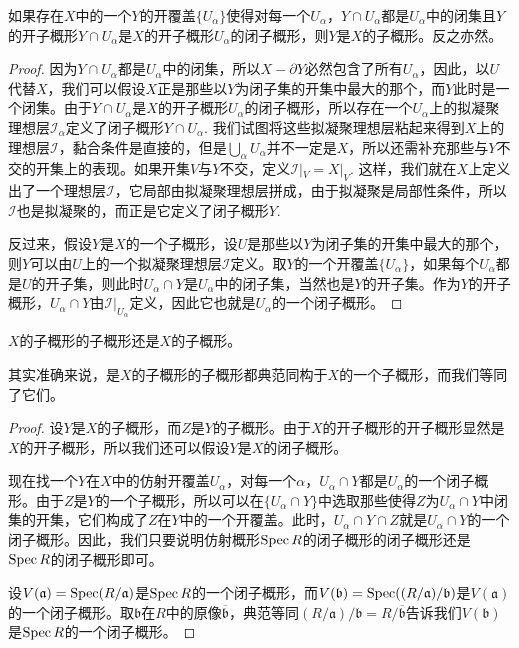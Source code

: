 \begin{pro}[子概形的局部刻画]
如果存在$X$中的一个$Y$的开覆盖$\{U_\alpha\}$使得对每一个$U_\alpha$，$Y\cap U_\alpha$都是$U_\alpha$中的闭集且$Y$的开子概形$Y\cap U_\alpha$是$X$的开子概形$U_\alpha$的闭子概形，则$Y$是$X$的子概形。反之亦然。
\end{pro}

\begin{proof}
	因为$Y\cap U_\alpha$都是$U_\alpha$中的闭集，所以$X-\partial Y$必然包含了所有$U_\alpha$，因此，以$U$代替$X$，我们可以假设$X$正是那些以$Y$为闭子集的开集中最大的那个，而$Y$此时是一个闭集。由于$Y\cap U_\alpha$是$X$的开子概形$U_\alpha$的闭子概形，所以存在一个$U_\alpha$上的拟凝聚理想层$\mathscr I_\alpha$定义了闭子概形$Y\cap U_\alpha$. 我们试图将这些拟凝聚理想层粘起来得到$X$上的理想层$\mathscr I$，黏合条件是直接的，但是$\bigcup_\alpha U_\alpha$并不一定是$X$，所以还需补充那些与$Y$不交的开集上的表现。如果开集$V$与$Y$不交，定义$\mathscr I|_V=X|_V$. 这样，我们就在$X$上定义出了一个理想层$\mathscr I$，它局部由拟凝聚理想层拼成，由于拟凝聚是局部性条件，所以$\mathscr I$也是拟凝聚的，而正是它定义了闭子概形$Y$.

	反过来，假设$Y$是$X$的一个子概形，设$U$是那些以$Y$为闭子集的开集中最大的那个，则$Y$可以由$U$上的一个拟凝聚理想层$\mathscr I$定义。取$Y$的一个开覆盖$\{U_\alpha\}$，如果每个$U_\alpha$都是$U$的开子集，则此时$U_\alpha\cap Y$是$U_\alpha$中的闭子集，当然也是$Y$的开子集。作为$Y$的开子概形，$U_\alpha\cap Y$由$\mathscr I|_{U_\alpha}$定义，因此它也就是$U_\alpha$的一个闭子概形。
\end{proof}

\begin{coro}
$X$的子概形的子概形还是$X$的子概形。
\end{coro}

其实准确来说，是$X$的子概形的子概形都典范同构于$X$的一个子概形，而我们等同了它们。

\begin{proof}
设$Y$是$X$的子概形，而$Z$是$Y$的子概形。由于$X$的开子概形的开子概形显然是$X$的开子概形，所以我们还可以假设$Y$是$X$的闭子概形。

现在找一个$Y$在$X$中的仿射开覆盖$U_\alpha$，对每一个$\alpha$，$U_\alpha\cap Y$都是$U_\alpha$的一个闭子概形。由于$Z$是$Y$的一个子概形，所以可以在$\{U_\alpha\cap Y\}$中选取那些使得$Z$为$U_\alpha\cap Y$中闭集的开集，它们构成了$Z$在$Y$中的一个开覆盖。此时，$U_\alpha\cap Y\cap Z$就是$U_\alpha\cap Y$的一个闭子概形。因此，我们只要说明仿射概形$\operatorname{Spec} R$的闭子概形的闭子概形还是$\operatorname{Spec} R$的闭子概形即可。

设$V(\mathfrak{a})=\operatorname{Spec}(R/\mathfrak{a})$是$\operatorname{Spec} R$的一个闭子概形，而$V(\mathfrak{b})=\operatorname{Spec}((R/\mathfrak{a})/\mathfrak{b})$是$V(\mathfrak{a})$的一个闭子概形。取$\mathfrak{b}$在$R$中的原像$\overline{\mathfrak b}$，典范等同$(R/\mathfrak{a})/\mathfrak{b}=R/\overline{\mathfrak b}$告诉我们$V(\mathfrak{b})$是$\operatorname{Spec} R$的一个闭子概形。
\end{proof}


